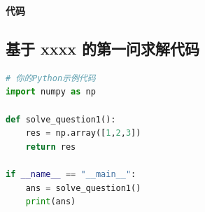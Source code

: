 \begin{center}
\Large\textbf{代码}
\end{center}

\subsection*{基于 xxxx 的第一问求解代码}
\begin{lstlisting}[language=Python]
# 你的Python示例代码
import numpy as np

def solve_question1():
    res = np.array([1,2,3])
    return res

if __name__ == "__main__":
    ans = solve_question1()
    print(ans)
\end{lstlisting}